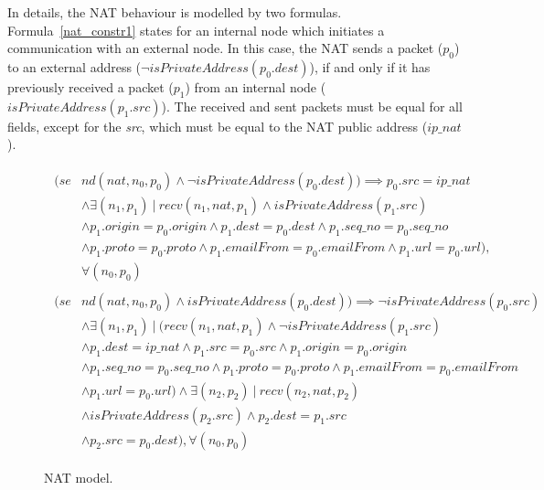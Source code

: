 In details, the NAT behaviour is modelled by two formulas. Formula~\ref{nat_constr1} states for an internal node which initiates a communication with an external node. In this case, the NAT sends a packet (\textit{$p_0$}) to an external address (\textit{$\neg isPrivateAddress(p_{0}.dest)$}), if and only if it has previously received a packet (\textit{$p_1$}) from an internal node (\textit{$isPrivateAddress(p_{1}.src)$}). The received and sent packets must be equal for all fields, except for the \textit{src}, which must be equal to the NAT public address (\textit{$ip\_nat$}).\\


\begin{figure}[h]
	{\footnotesize
		\begin{subequations}
			\begin{align}
			\begin{split}
			\label{nat_constr1}
			(se& nd(nat, n_{0}, p_{0}) \wedge \neg isPrivateAddress(p_{0}.dest)) \implies p_{0}.src = ip\_nat \\
			& \wedge \exists (n_{1}, p_{1}) \: | \: recv(n_{1}, nat, p_{1}) \wedge isPrivateAddress(p_{1}.src) \\
			& \wedge p_{1}.origin = p_{0}.origin \wedge p_{1}.dest = p_{0}.dest \wedge p_{1}.seq\_no = p_{0}.seq\_no \\
			& \wedge p_{1}.proto = p_{0}.proto \wedge p_{1}.emailFrom = p_{0}.emailFrom \wedge p_{1}.url = p_{0}.url), \\
			& \forall (n_{0}, p_{0})
			\end{split} \\
			\begin{split}
			\label{nat_constr2}
			(se& nd(nat, n_{0}, p_{0}) \wedge isPrivateAddress(p_{0}.dest)) \implies \neg isPrivateAddress(p_{0}.src) \\
			& \wedge \exists  (n_{1}, p_{1}) \: | \: (recv(n_{1}, nat, p_{1}) \wedge \neg isPrivateAddress(p_{1}.src) \\
			& \wedge p_{1}.dest = ip\_nat \wedge p_{1}.src = p_{0}.src \wedge p_{1}.origin = p_{0}.origin \\
			& \wedge p_{1}.seq\_no = p_{0}.seq\_no \wedge p_{1}.proto = p_{0}.proto \wedge p_{1}.emailFrom = p_{0}.emailFrom \\
			& \wedge p_{1}.url = p_{0}.url) \wedge \exists (n_{2}, p_{2}) \: | \:  recv(n_{2}, nat, p_{2}) \\
			& \wedge isPrivateAddress(p_{2}.src) \wedge p_{2}.dest = p_{1}.src  \\
			& \wedge p_{2}.src = p_{0}.dest), \forall (n_{0}, p_{0})
			\end{split}
			\end{align}
		\end{subequations}
	}%
	\caption{NAT model.}
	\label{nat_model}
\end{figure}

